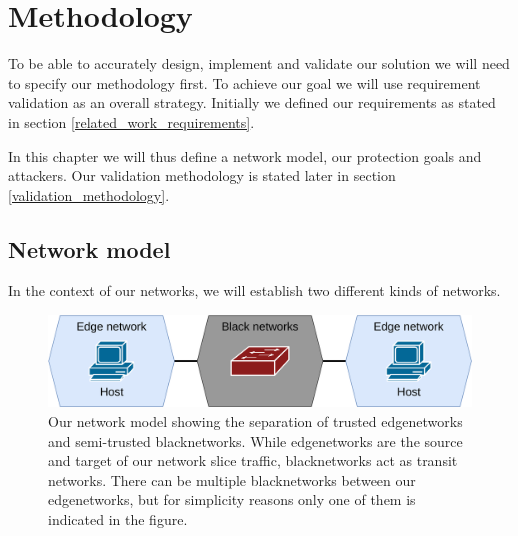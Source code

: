 \chapter{Methodology}
\label{methodology}

To be able to accurately design, implement and validate our solution we will need to specify our methodology first. To achieve our goal we will use requirement validation as an overall strategy. Initially we defined our requirements as stated in section \ref{related_work_requirements}.

In this chapter we will thus define a network model, our protection goals and attackers. Our validation methodology is stated later in section \ref{validation_methodology}.


\section{Network model}
In the context of our networks, we will establish two different kinds of networks.

\begin{figure}[ht]
    \centering
    \includegraphics[width=\textwidth]{images/chapter_4/network_model.png}
    \caption[Network model]{Our network model showing the separation of trusted \gls{edgenetwork}s and semi-trusted \gls{blacknetwork}s. While \gls{edgenetwork}s are the source and target of our network slice traffic, \gls{blacknetwork}s act as transit networks. There can be multiple \gls{blacknetwork}s between our \gls{edgenetwork}s, but for simplicity reasons only one of them is indicated in the figure.}
    \label{fig:network_model}
\end{figure}

